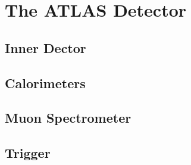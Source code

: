 \chapter{The ATLAS Detector}
\label{sec:atlas}

\cite{ATLAS}


\section{Inner Dector}
\section{Calorimeters }
\section{Muon Spectrometer}
\section{Trigger}

